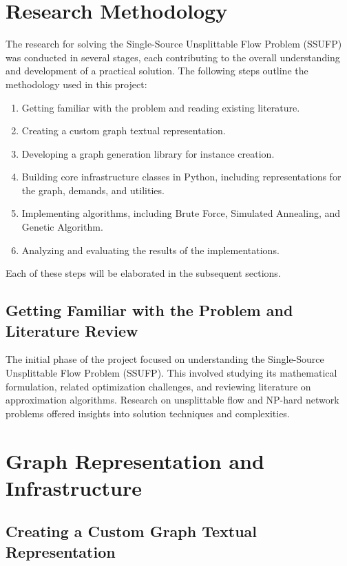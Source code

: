 \documentclass[a4paper,12pt]{article}
\begin{document}
\section{Research Methodology}

The research for solving the Single-Source Unsplittable Flow Problem (SSUFP) was conducted in several stages, each contributing to the overall understanding and development of a practical solution. The following steps outline the methodology used in this project:

\begin{enumerate}
    \item Getting familiar with the problem and reading existing literature.
    \item Creating a custom graph textual representation.
    \item Developing a graph generation library for instance creation.
    \item Building core infrastructure classes in Python, including representations for the graph, demands, and utilities.
    \item Implementing algorithms, including Brute Force, Simulated Annealing, and Genetic Algorithm.
    \item Analyzing and evaluating the results of the implementations.
\end{enumerate}

\noindent Each of these steps will be elaborated in the subsequent sections.

\subsection{Getting Familiar with the Problem and Literature Review}

The initial phase of the project focused on understanding the Single-Source Unsplittable Flow Problem (SSUFP). This involved studying its mathematical formulation, related optimization challenges, and reviewing literature on approximation algorithms. Research on unsplittable flow and NP-hard network problems offered insights into solution techniques and complexities.

\section{Graph Representation and Infrastructure}

\subsection{Creating a Custom Graph Textual Representation}
\end{document}
